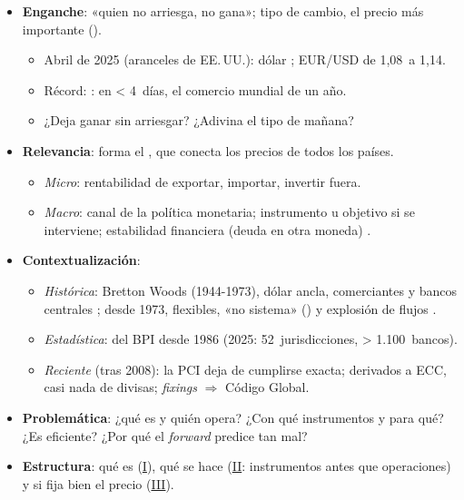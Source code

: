 \documentclass{article}
\begin{document}
\cabecerarepaso
\begin{columnas}

\begin{itemize}
\item \textbf{Enganche}: «quien no arriesga, no gana»; tipo de cambio, el precio más importante ().
  \begin{itemize}
    \item Abril de 2025 (aranceles de EE.\,UU.): dólar ; EUR/USD de 1,08~a 1,14.
  \item Récord: : en < 4~días, el comercio mundial de un año.
  \item ¿Deja ganar sin arriesgar? ¿Adivina el tipo de mañana?
  \end{itemize}
\item \textbf{Relevancia}: forma el , que conecta los precios de todos los países.
  \begin{itemize}
  \item \emph{Micro}: rentabilidad de exportar, importar, invertir fuera.
  \item \emph{Macro}: canal de la política monetaria; instrumento u objetivo si se interviene; estabilidad financiera (deuda en otra moneda) .
  \end{itemize}
\item \textbf{Contextualización}:
  \begin{itemize}
  \item \emph{Histórica}: Bretton Woods (1944-1973), dólar ancla, comerciantes y bancos centrales ; desde 1973, flexibles, «no sistema» () y explosión de flujos .
  \item \emph{Estadística}:  del BPI desde 1986 (2025: 52~jurisdicciones, > 1.100~bancos).
  \item \emph{Reciente} (tras 2008): la PCI deja de cumplirse exacta; derivados a ECC, casi nada de divisas; \emph{fixings} $\Rightarrow$ Código Global.
  \end{itemize}
\item \textbf{Problemática}: ¿qué es y quién opera? ¿Con qué instrumentos y para qué? ¿Es eficiente? ¿Por qué el \emph{forward} predice tan mal?
\item \textbf{Estructura}: qué es (\hyperref[rep:I]{I}), qué se hace (\hyperref[rep:II]{II}: instrumentos antes que operaciones) y si fija bien el precio (\hyperref[rep:III]{III}).

\end{itemize}
\end{columnas}
\end{document}
